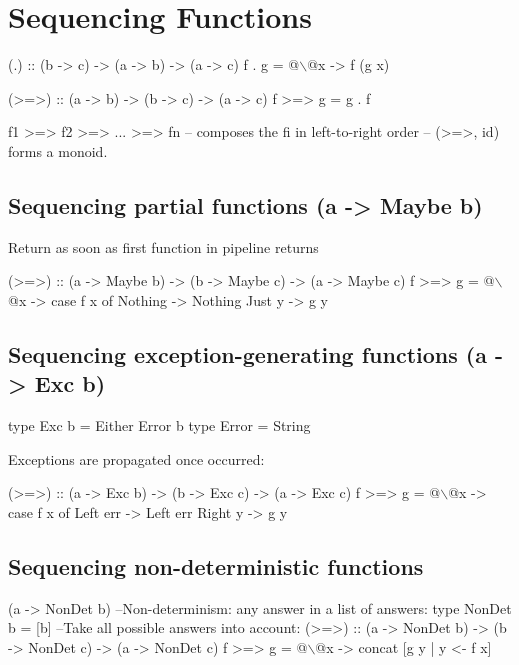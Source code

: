 
\section{Sequencing Functions}
\begin{Haskell}
(.) :: (b -> c) -> (a -> b) -> (a -> c)
f . g = @$\backslash$@x -> f (g x)

(>=>) :: (a -> b) -> (b -> c) -> (a -> c)
f >=> g = g . f

f1 >=> f2 >=> ... >=> fn -- composes the fi in left-to-right order
-- (>=>, id) forms a monoid.
\end{Haskell}

\subsection{Sequencing partial functions (a -> Maybe b)}
Return  as soon as first function in pipeline returns 

\begin{Haskell}
(>=>) :: (a -> Maybe b) -> (b -> Maybe c) -> (a -> Maybe c)
f >=> g = @$\backslash$@x -> case f x of
                                       Nothing -> Nothing
                                       Just y -> g y
\end{Haskell}

\subsection{Sequencing exception-generating functions (a -> Exc b)}
\begin{Haskell}
type Exc b = Either Error b
type Error = String
\end{Haskell}

Exceptions are propagated once occurred:

\begin{Haskell}
(>=>) :: (a -> Exc b) -> (b -> Exc c) -> (a -> Exc c)
f >=> g = @$\backslash$@x -> case f x of
                                       Left err -> Left err
                                       Right y -> g y
\end{Haskell}

\subsection{Sequencing non-deterministic functions}
\begin{Haskell}
(a -> NonDet b)
--Non-determinism: any answer in a list of answers:
type NonDet b = [b]
--Take all possible answers into account:
(>=>) :: (a -> NonDet b) -> (b -> NonDet c) -> (a -> NonDet c)
f >=> g = @$\backslash$@x -> concat [g y | y <- f x]
\end{Haskell}

